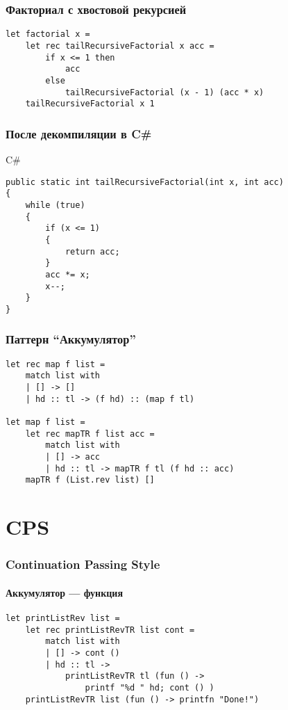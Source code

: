 \documentclass[xetex,mathserif,serif]{beamer}
\begin{document}
    \begin{frame}[fragile]
        \frametitle{Факториал с хвостовой рекурсией}
        \begin{verbatim}
let factorial x =
    let rec tailRecursiveFactorial x acc =
        if x <= 1 then
            acc
        else
            tailRecursiveFactorial (x - 1) (acc * x)
    tailRecursiveFactorial x 1
        \end{verbatim}
    \end{frame}
    
    \begin{frame}[fragile]
        \frametitle{После декомпиляции в C\#}
        \begin{alertblock}{C\#}
            \begin{verbatim}
public static int tailRecursiveFactorial(int x, int acc)
{
    while (true)
    {
        if (x <= 1)
        {
            return acc;
        }
        acc *= x;
        x--;
    }
}
            \end{verbatim}
        \end{alertblock}
    \end{frame}

    \begin{frame}[fragile]
        \frametitle{Паттерн ``Аккумулятор''}
        \begin{verbatim}
let rec map f list =
    match list with
    | [] -> []
    | hd :: tl -> (f hd) :: (map f tl)

let map f list =
    let rec mapTR f list acc =
        match list with
        | [] -> acc
        | hd :: tl -> mapTR f tl (f hd :: acc)
    mapTR f (List.rev list) []
        \end{verbatim}
    \end{frame}

    \section{CPS}

    \begin{frame}[fragile]
        \frametitle{Continuation Passing Style}
        \framesubtitle{Аккумулятор --- функция}
        \begin{verbatim}
let printListRev list =
    let rec printListRevTR list cont =
        match list with
        | [] -> cont ()
        | hd :: tl ->
            printListRevTR tl (fun () -> 
                printf "%d " hd; cont () )
    printListRevTR list (fun () -> printfn "Done!")
        \end{verbatim}
    \end{frame}
\end{document}
